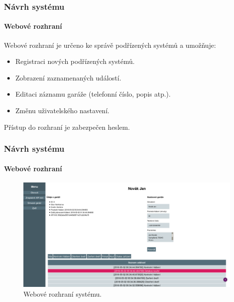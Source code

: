 \documentclass{beamer}
\begin{document}
  \begin{frame}
    \frametitle{Návrh systému}
    \framesubtitle{Webové rozhraní}

    Webové rozhraní je určeno ke správě podřízených systémů a umožňuje:

    \begin{itemize}
      \item Registraci nových podřízených systémů.
      \item Zobrazení zaznamenaných událostí.
      \item Editaci záznamu garáže (telefonní číslo, popis atp.).
      \item Změnu uživatelského nastavení.
    \end{itemize}

    Přístup do rozhraní je zabezpečen heslem.
    
  \end{frame}

  \begin{frame}
    \frametitle{Návrh systému}
    \framesubtitle{Webové rozhraní}


    \begin{figure}
        \includegraphics[scale=0.161]{../images/webp.png}
        \caption{Webové rozhraní systému.}
      \end{figure}
    
  \end{frame}
\end{document}
